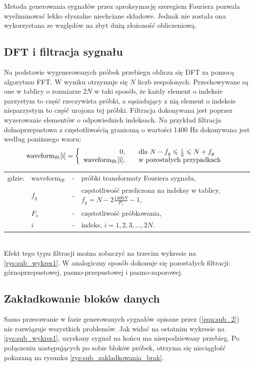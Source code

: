 Metoda generowania sygnałów przez aproksymację szeregiem Fouriera pozwala wyeliminować lekko słyszalne niechciane składowe. Jednak nie została ona wykorzystana ze względów na zbyt dużą złożoność obliczeniową. 

\subsection{DFT i filtracja sygnału}
Na podstawie wygenerowanych próbek przebiegu oblicza się DFT za pomocą algorytmu FFT. W wyniku otrzymuje się $N$ liczb zespolonych. Przechowywane są one w tablicy o rozmiarze $2N$ w taki sposób, że każdy element o indeksie parzystym to część rzeczywista próbki, a sąsiadujący z nią element o indeksie nieparzystym to część urojona tej próbki. Filtracja dokonywana jest poprzez wyzerowanie elementów o odpowiednich indeksach. Na przykład filtracja dolnoprzepustowa z częstotliwością graniczną o wartości 1400 Hz dokonywana jest według poniższego wzoru:
\begin{equation} \label{equ:sub_3}
\text{waveform}_{\text{fft}}\text{[i]}=\left \{\begin{array}{ r l }
0, & \quad  \text{dla } N - f_g \leqslant \frac{i}{2} \leqslant N + f_g \\
\text{waveform}_{\text{fft}}\text{[i]}, & \quad \text{w pozostałych przypadkach } 

\end{array}
\right.
\end{equation}
\begin{tabular}{ l l l l}
	gdzie: & $\text{waveform}_{\text{fft}}$ &  - & próbki transformaty Fouriera sygnału, \\
	&	$f_g$ & - &  częstotliwość przeliczona na indeksy w tablicy, $f_g = N - 2 \frac{1400N}{F_s} - 1$, \\
	&	$F_s$ & - & częstotliwość próbkowania,\\
	&	$i$ & - &  indeks, $i = 1, 2, 3, ..., 2N$.\\
\end{tabular} \\

Efekt tego typu filtracji można zobaczyć na trzecim wykresie na \ref{rys:sub_wykres1}. W analogiczny sposób dokonuje się pozostałych filtracji: górnoprzepustowej, pasmo-przepustowej i pasmo-zaporowej.

\subsection{Zakładkowanie bloków danych}
Samo przesuwanie w fazie generowanych sygnałów opisane przez (\ref{equ:sub_2}) nie rozwiązuje wszystkich problemów. Jak widać na ostatnim wykresie na \ref{rys:sub_wykres1}, uzyskany sygnał na końcu ma niespodziewany przebieg. Po połączeniu następujących po sobie bloków próbek, otrzyma się nieciągłość pokazaną na rysunku \ref{rys:sub_zakladkowania_brak}.

